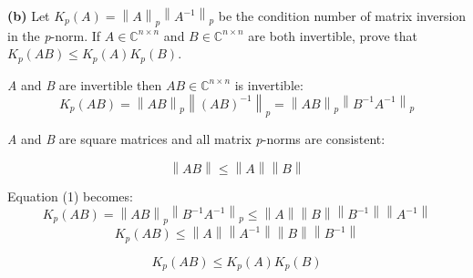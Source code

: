 \documentclass[a4paper,11pt]{article}
\newcommand{\norm}[1]{\left\lVert #1 \right\rVert}
\begin{document}
\textbf{(b)} Let $K_p(A)=\norm{A}_p\norm{A^{-1}}_p$ be the condition number of matrix inversion in the \textit{p}-norm. If $A \in \mathbb{C}^{n\times n}$ and $B \in \mathbb{C}^{n\times n}$ are both invertible, prove that $K_p(AB)\leq K_p(A)K_p(B)$.
\\
\setcounter{equation}{0}
\begin{margin}{0.5cm}{0.5cm}
	\textit{A} and \textit{B} are invertible then $AB \in \mathbb{C}^{n\times n}$ is invertible:
	\begin{equation}
		K_p(AB) = \norm{AB}_p\norm{(AB)^{-1}}_p = \norm{AB}_p\norm{B^{-1}A^{-1}}_p
	\end{equation}
	
	\textit{A} and \textit{B} are square matrices and all matrix \textit{p}-norms are consistent:
	
	\begin{equation*}
		\norm{AB} \leq \norm{A} \norm{B}
	\end{equation*}
	
	Equation (1) becomes:
	\begin{equation}
		K_p(AB) = \norm{AB}_p\norm{B^{-1}A^{-1}}_p \leq \norm{A} \norm{B} \norm{B^{-1}} \norm{A^{-1}}
	\end{equation}
	\begin{equation*}
		K_p(AB) \leq \norm{A} \norm{A^{-1}} \norm{B} \norm{B^{-1}}
	\end{equation*}
	
	\begin{equation*}
		K_p(AB) \leq K_p(A)K_p(B)
	\end{equation*}
	
\end{margin}
\end{document}

